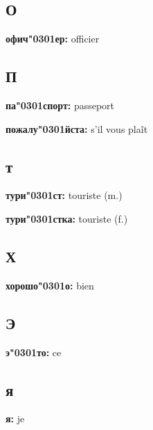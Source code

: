\documentclass[a5paper, 10pt]{article}
\newcommand{\лекси}[2]{{\textbf{#1: }{#2}\par}}
\newcommand{\ак}[0]{\char"0301} %
\begin{document}
\begin{multicols}{2}
  \subsection*{О}
  
  \лекси{офич\ак ер}{officier}

  \subsection*{П}
  
  \лекси{па\ак спорт}{passeport}
  \лекси{пожалу\ак йста}{s'il vous plaît}
    
  \subsection*{т}

  \лекси{тури\ак ст}{touriste (m.)}
  \лекси{тури\ак стка}{touriste (f.)}

  \subsection*{Х}
  \лекси{хорошо\ак о}{bien}
  
  \subsection*{Э}
  
  \лекси{э\ак то}{ce}

  \subsection*{я}

  \лекси{я}{je}
  
\end{multicols}
\end{document}
